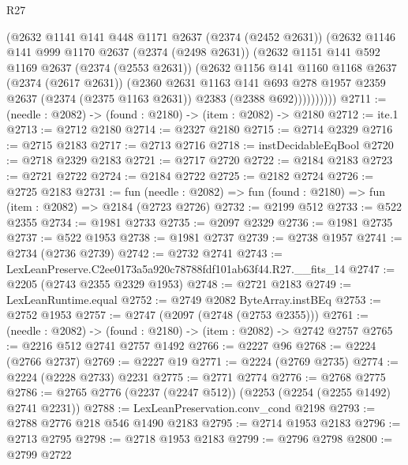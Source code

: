 \begin{lexlean}{R27}
\begin{coremodule}
            (@2632
              @1141
              @141
              @448
              @1171
              @2637
              (@2374 (@2452 @2631))
              (@2632
                @1146
                @141
                @999
                @1170
                @2637
                (@2374 (@2498 @2631))
                (@2632
                  @1151
                  @141
                  @592
                  @1169
                  @2637
                  (@2374 (@2553 @2631))
                  (@2632
                    @1156
                    @141
                    @1160
                    @1168
                    @2637
                    (@2374 (@2617 @2631))
                    (@2360
                      @2631
                      @1163
                      @141
                      @693
                      @278
                      @1957
                      @2359
                      @2637
                      (@2374 (@2375 @1163 @2631))
                      @2383
                      (@2388 @692))))))))))
@2711 := (needle : @2082) -> (found : @2180) -> (item : @2082) -> @2180
@2712 := ite.{1}
@2713 := @2712 @2180
@2714 := @2327 @2180
@2715 := @2714 @2329
@2716 := @2715 @2183
@2717 := @2713 @2716
@2718 := instDecidableEqBool
@2720 := @2718 @2329 @2183
@2721 := @2717 @2720
@2722 := @2184 @2183
@2723 := @2721 @2722
@2724 := @2184 @2722
@2725 := @2182 @2724
@2726 := @2725 @2183
@2731 := fun (needle : @2082) => fun (found : @2180) => fun (item : @2082) => @2184 (@2723 @2726)
@2732 := @2199 @512
@2733 := @522 @2355
@2734 := @1981 @2733
@2735 := @2097 @2329
@2736 := @1981 @2735
@2737 := @522 @1953
@2738 := @1981 @2737
@2739 := @2738 @1957
@2741 := @2734 (@2736 @2739)
@2742 := @2732 @2741
@2743 := LexLeanPreserve.C2ee0173a5a920c78788fdf101ab63f44.R27.__fits_14
@2747 := @2205 (@2743 @2355 @2329 @1953)
@2748 := @2721 @2183
@2749 := LexLeanRuntime.equal
@2752 := @2749 @2082 ByteArray.instBEq
@2753 := @2752 @1953
@2757 := @2747 (@2097 (@2748 (@2753 @2355)))
@2761 := (needle : @2082) -> (found : @2180) -> (item : @2082) -> @2742 @2757
@2765 := @2216 @512 @2741 @2757 @1492
@2766 := @2227 @96
@2768 := @2224 (@2766 @2737)
@2769 := @2227 @19
@2771 := @2224 (@2769 @2735)
@2774 := @2224 (@2228 @2733) @2231
@2775 := @2771 @2774
@2776 := @2768 @2775
@2786 := @2765 @2776 (@2237 (@2247 @512)) (@2253 (@2254 (@2255 @1492) @2741 @2231))
@2788 := LexLeanPreservation.conv_cond @2198
@2793 := @2788 @2776 @218 @546 @1490 @2183
@2795 := @2714 @1953 @2183
@2796 := @2713 @2795
@2798 := @2718 @1953 @2183
@2799 := @2796 @2798
@2800 := @2799 @2722

\end{coremodule}
\end{lexlean}
